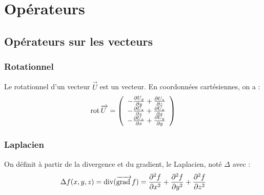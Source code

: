 \chapter{Opérateurs}
\section{Opérateurs sur les vecteurs}
\subsection{Rotationnel}
Le rotationnel d'un vecteur $\vec{U}$ est un vecteur. En coordonnées cartésiennes, on a :
\[
\operatorname{rot}\overrightarrow{U\:} = \left(
\begin{array}{c}
	-\frac{\partial U_y}{\partial y} + \frac{\partial U_z}{\partial z}\\
	-\frac{\partial U_z}{\partial z} + \frac{\partial U_x}{\partial x}\\
	-\frac{\partial U_x}{\partial x} + \frac{\partial U_y}{\partial y}\\
\end{array}
\right)
\]
\subsection{Laplacien}
On définit à partir de la divergence et du gradient, le Laplacien, noté $\Delta$ avec :
\[
\Delta f(x,y,z) = \operatorname{div}(\overrightarrow{\text{grad}\:} f)= \frac{\partial^2f}{\partial x^2} + \frac{\partial^2f}{\partial y^2} + \frac{\partial^2f}{\partial z^2}
\]
